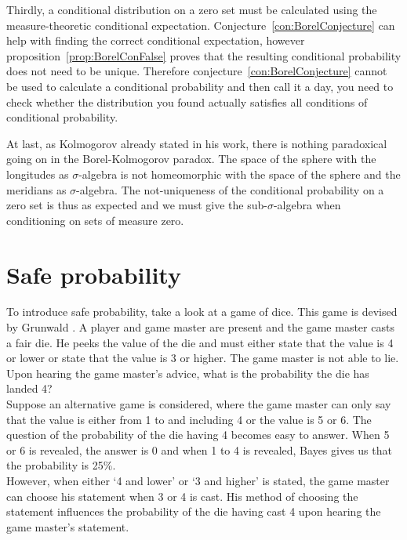 \documentclass[twoside,a4paper]{report}
\theoremstyle{plain}
\theoremstyle{definition}
\theoremstyle{remark}
\numberwithin{equation}{chapter}
\DeclareMathOperator{\1}{\mathbbm{1}}
\begin{document}
Thirdly, a conditional distribution on a zero set must be calculated using the measure-theoretic conditional expectation. Conjecture~\ref{con:BorelConjecture} can help with finding the correct conditional expectation, however proposition~\ref{prop:BorelConFalse} proves that the resulting conditional probability does not need to be unique. Therefore conjecture~\ref{con:BorelConjecture} cannot be used to calculate a conditional probability and then call it a day, you need to check whether the distribution you found actually satisfies all conditions of conditional probability.

At last, as Kolmogorov \cite{Kolmogorov33} already stated in his work, there is nothing paradoxical going on in the Borel-Kolmogorov paradox. The space of the sphere with the longitudes as $\sigma$-algebra is not homeomorphic with the space of the sphere and the meridians as $\sigma$-algebra. The not-uniqueness of the conditional probability on a zero set is thus as expected and we must give the sub-$\sigma$-algebra when conditioning on sets of measure zero.


\chapter{Safe probability}\label{chap:SafeProp}
To introduce safe probability, take a look at a game of dice. This game is devised by Grunwald \cite{Grunwald13}. A player and game master are present and the game master casts a fair die. He peeks the value of the die and must either state that the value is 4 or lower or state that the value is 3 or higher. The game master is not able to lie. Upon hearing the game master's advice, what is the probability the die has landed 4?\\
Suppose an alternative game is considered, where the game master can only say that the value is either from 1 to and including 4 or the value is 5 or 6. The question of the probability of the die having 4 becomes easy to answer. When 5 or 6 is revealed, the answer is 0 and when 1 to 4 is revealed, Bayes gives us that the probability is 25\%.\\
However, when either `4 and lower' or `3 and higher' is stated, the game master can choose his statement when 3 or 4 is cast. His method of choosing the statement influences the probability of the die having cast 4 upon hearing the game master's statement.
\end{document}
